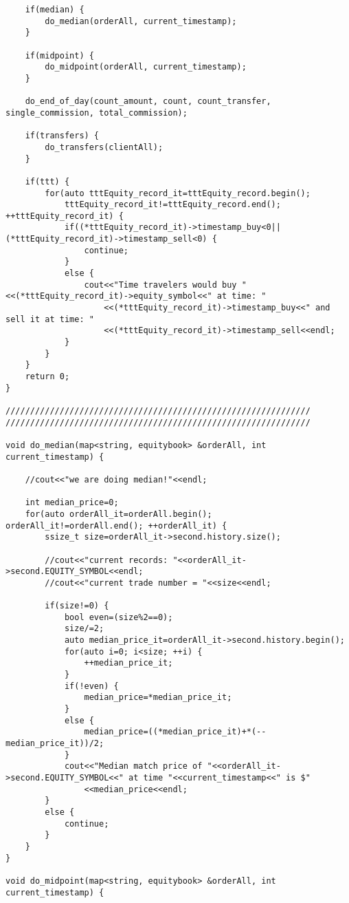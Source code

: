 \documentclass{article}
\begin{document}
\begin{spacing}{1.5}
\begin{lstlisting}
    if(median) {
        do_median(orderAll, current_timestamp);
    }

    if(midpoint) {
        do_midpoint(orderAll, current_timestamp);
    }

    do_end_of_day(count_amount, count, count_transfer, single_commission, total_commission);

    if(transfers) {
        do_transfers(clientAll);
    }

    if(ttt) {
        for(auto tttEquity_record_it=tttEquity_record.begin();
            tttEquity_record_it!=tttEquity_record.end(); ++tttEquity_record_it) {
            if((*tttEquity_record_it)->timestamp_buy<0||(*tttEquity_record_it)->timestamp_sell<0) {
                continue;
            }
            else {
                cout<<"Time travelers would buy "<<(*tttEquity_record_it)->equity_symbol<<" at time: "
                    <<(*tttEquity_record_it)->timestamp_buy<<" and sell it at time: "
                    <<(*tttEquity_record_it)->timestamp_sell<<endl;
            }
        }
    }
    return 0;
}

//////////////////////////////////////////////////////////////
//////////////////////////////////////////////////////////////

void do_median(map<string, equitybook> &orderAll, int current_timestamp) {

    //cout<<"we are doing median!"<<endl;

    int median_price=0;
    for(auto orderAll_it=orderAll.begin(); orderAll_it!=orderAll.end(); ++orderAll_it) {
        ssize_t size=orderAll_it->second.history.size();

        //cout<<"current records: "<<orderAll_it->second.EQUITY_SYMBOL<<endl;
        //cout<<"current trade number = "<<size<<endl;

        if(size!=0) {
            bool even=(size%2==0);
            size/=2;
            auto median_price_it=orderAll_it->second.history.begin();
            for(auto i=0; i<size; ++i) {
                ++median_price_it;
            }
            if(!even) {
                median_price=*median_price_it;
            }
            else {
                median_price=((*median_price_it)+*(--median_price_it))/2;
            }
            cout<<"Median match price of "<<orderAll_it->second.EQUITY_SYMBOL<<" at time "<<current_timestamp<<" is $"
                <<median_price<<endl;
        }
        else {
            continue;
        }
    }
}

void do_midpoint(map<string, equitybook> &orderAll, int current_timestamp) {


\end{lstlisting}
\end{spacing}
\end{document}
